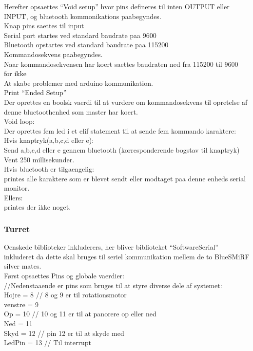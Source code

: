 Herefter opsaettes “Void setup” hvor pins defineres til inten OUTPUT eller INPUT, og bluetooth kommonikations paabegyndes.\\
	Knap pins saettes til input\\
	Serial port startes ved standard baudrate paa 9600\\
	Bluetooth opstartes ved standard baudrate paa 115200\\
	Kommandosekvens paabegyndes.\\
	Naar kommandosekvensen har koert saettes baudraten ned fra 115200 til 9600\\ for ikke\\
	At skabe problemer med arduino kommunikation.\\
	Print “Ended Setup”\\

Der oprettes en boolsk vaerdi til at vurdere om kommandosekvens til opretelse af denne bluetoothenhed som master har koert.\\

Void loop:\\
	Der oprettes fem led i et elif statement til at sende fem kommando karaktere:\\
	Hvis knaptryk(a,b,c,d eller e):\\
		Send a,b,c,d eller e gennem bluetooth (korresponderende bogstav til knaptryk)\\
		Vent 250 millisekunder.\\
	Hvis bluetooth er tilgaengelig:\\
printes alle karaktere som er blevet sendt eller modtaget paa denne enheds serial  monitor.\\
	Ellers:\\
 printes der ikke noget.\\
 

\subsubsection{Turret}
Oenskede biblioteker inkluderers, her bliver biblioteket “SoftwareSerial” inkluderet da dette skal bruges til seriel kommunikation mellem de to BlueSMiRF silver mates.\\

Først opsaettes Pins og globale vaerdier:\\
	//Nedenstaaende er pins som bruges til at styre diverse dele af systemet:\\
	Hojre = 8 // 8 og 9 er til rotationsmotor\\
	venstre = 9\\
	Op = 10  // 10 og 11 er til at panorere op eller ned\\
	Ned = 11\\
	Skyd = 12 // pin 12 er til at skyde med\\
	LedPin = 13 // Til interrupt\\
	
